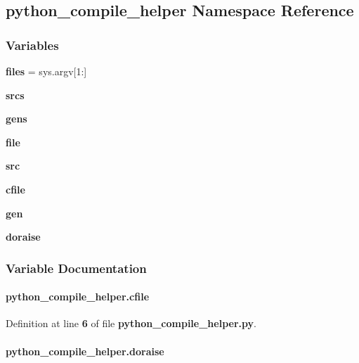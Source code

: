 \subsection{python\+\_\+compile\+\_\+helper Namespace Reference}
\label{namespacepython__compile__helper}
\subsubsection*{Variables}
\begin{DoxyCompactItemize}
\item 
{\bf files} = sys.\+argv[1\+:]
\item 
{\bf srcs}
\item 
{\bf gens}
\item 
{\bf file}
\item 
{\bf src}
\item 
{\bf cfile}
\item 
{\bf gen}
\item 
{\bf doraise}
\end{DoxyCompactItemize}


\subsubsection{Variable Documentation}
\paragraph[{cfile}]{\setlength{\rightskip}{0pt plus 5cm}python\+\_\+compile\+\_\+helper.\+cfile}\label{namespacepython__compile__helper_a9be8b418b521c464d6e63e3339f6a3be}


Definition at line {\bf 6} of file {\bf python\+\_\+compile\+\_\+helper.\+py}.

\paragraph[{doraise}]{\setlength{\rightskip}{0pt plus 5cm}python\+\_\+compile\+\_\+helper.\+doraise}\label{namespacepython__compile__helper_a804cb6abe13a7ee3d2fd416a84d84d5b}


